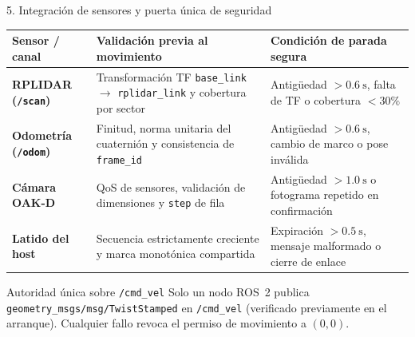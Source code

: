\documentclass[aspectratio=169,10pt]{beamer}
\begin{document}
\begin{frame}{5. Integración de sensores y puerta única de seguridad}
  \begin{table}
    \centering
    \footnotesize
    \begin{tabularx}{\textwidth}{@{}P{2.6cm}P{4.1cm}Y@{}}
      \hline
      \textbf{Sensor / canal} & \textbf{Validación previa al movimiento} & \textbf{Condición de parada segura}\\
      \hline
      \textbf{RPLIDAR (\texttt{/scan})} &
      Transformación TF \texttt{base\_link} $\rightarrow$ \texttt{rplidar\_link} y cobertura por sector &
      Antigüedad $>0.6\ \mathrm{s}$, falta de TF o cobertura $<30\%$\\
      \textbf{Odometría (\texttt{/odom})} &
      Finitud, norma unitaria del cuaternión y consistencia de \texttt{frame\_id} &
      Antigüedad $>0.6\ \mathrm{s}$, cambio de marco o pose inválida\\
      \textbf{Cámara OAK-D} &
      QoS de sensores, validación de dimensiones y \texttt{step} de fila &
      Antigüedad $>1.0\ \mathrm{s}$ o fotograma repetido en confirmación\\
      \textbf{Latido del host} &
      Secuencia estrictamente creciente y marca monotónica compartida &
      Expiración $>0.5\ \mathrm{s}$, mensaje malformado o cierre de enlace\\
      \hline
    \end{tabularx}
  \end{table}

  \small
  \begin{block}{Autoridad única sobre \texttt{/cmd\_vel}}
    Solo un nodo ROS~2 publica \texttt{geometry\_msgs/msg/TwistStamped} en
    \texttt{/cmd\_vel} (verificado previamente en el arranque). Cualquier fallo
    revoca el permiso de movimiento a $(0,0)$.
  \end{block}
\end{frame}
\end{document}
